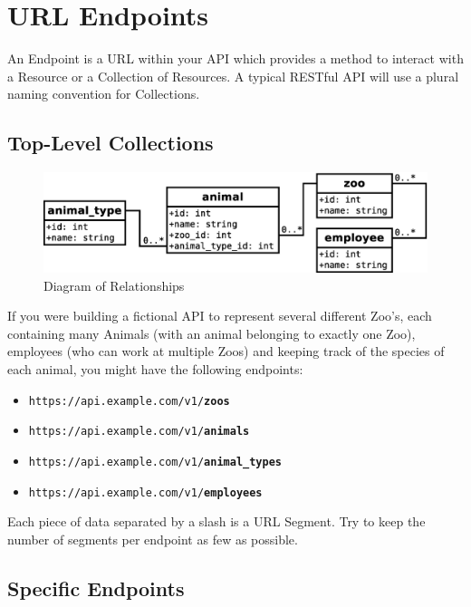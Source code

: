\section{URL Endpoints}

An Endpoint is a URL within your API which provides a method to interact with a Resource or a Collection of Resources. A typical RESTful API will use a plural naming convention for Collections.

\subsection{Top-Level Collections}

\begin{figure}[ht!]
\centering
\includegraphics[width=12cm]{images/zoo-relationships.eps}
\caption{Diagram of Relationships}
\label{fig:zoorelationships}
\end{figure}

If you were building a fictional API to represent several different Zoo's, each containing many Animals (with an animal belonging to exactly one Zoo), employees (who can work at multiple Zoos) and keeping track of the species of each animal, you might have the following endpoints:

\begin{itemize}
\item \texttt{https://api.example.com/v1/\textbf{zoos}}
\item \texttt{https://api.example.com/v1/\textbf{animals}}
\item \texttt{https://api.example.com/v1/\textbf{animal\_types}}
\item \texttt{https://api.example.com/v1/\textbf{employees}}
\end{itemize}

Each piece of data separated by a slash is a URL Segment. Try to keep the number of segments per endpoint as few as possible.

\subsection{Specific Endpoints}

